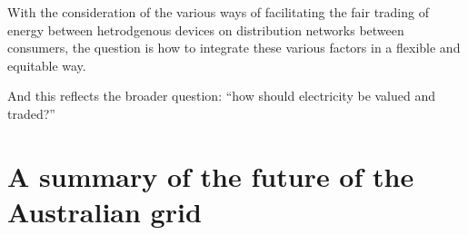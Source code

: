With the consideration of the various ways of facilitating the fair trading of energy between hetrodgenous devices on distribution networks between consumers, the question is how to integrate these various factors in a flexible and equitable way.

\noindent And this reflects the broader question: ``how should electricity be valued and traded?''


\section{A summary of the future of the Australian grid}\label{sec:intro_summary}






